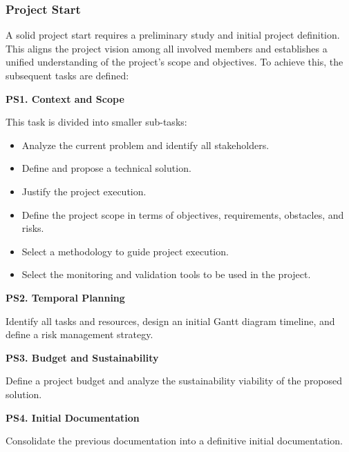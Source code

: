 \subsubsection{Project Start}

A solid project start requires a preliminary study and initial project definition. This aligns the project vision among all involved members and establishes a unified understanding of the project's scope and objectives. To achieve this, the subsequent tasks are defined:
 
\textbf{PS1. Context and Scope}

This task is divided into smaller sub-tasks:
\vspace{-5pt}
\begin{itemize}[leftmargin=0.75cm, noitemsep, label=\textbullet]
    \item Analyze the current problem and identify all stakeholders.
    \item Define and propose a technical solution.
    \item Justify the project execution.
    \item Define the project scope in terms of objectives, requirements, obstacles, and risks.
    \item Select a methodology to guide project execution.
    \item Select the monitoring and validation tools to be used in the project.
\end{itemize}

\textbf{PS2. Temporal Planning}

Identify all tasks and resources, design an initial Gantt diagram timeline, and define a risk management strategy.

\textbf{PS3. Budget and Sustainability}

Define a project budget and analyze the sustainability viability of the proposed solution.

\textbf{PS4. Initial Documentation}

Consolidate the previous documentation into a definitive initial documentation.



